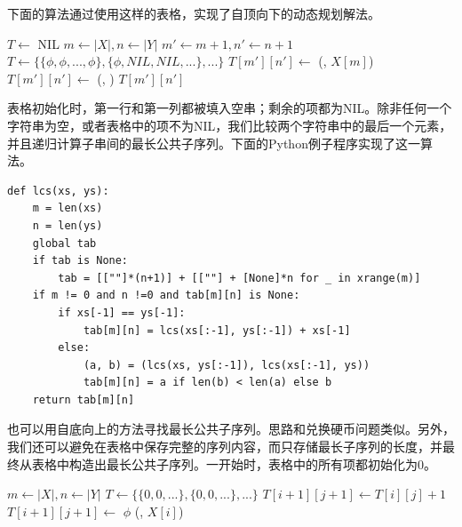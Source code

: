 \documentclass[b5paper]{ctexart}
\begin{document}
下面的算法通过使用这样的表格，实现了自顶向下的动态规划解法。

\begin{algorithmic}[1]
\State $T \gets$ NIL
  \State $m \gets |X|, n \gets |Y|$
  \State $m' \gets m+1, n' \gets n+1$
    \State $T \gets \{\{\phi, \phi, ..., \phi\}, \{\phi, NIL, NIL, ...\}, ...\}$ 
  \EndIf
      \State $T[m'][n'] \gets$ (, $X[m]$)
    \Else
      \State $T[m'][n'] \gets$ (, )
    \EndIf
  \EndIf
  \State \Return $T[m'][n']$
\EndFunction
\end{algorithmic}

表格初始化时，第一行和第一列都被填入空串；剩余的项都为NIL。除非任何一个字符串为空，或者表格中的项不为NIL，我们比较两个字符串中的最后一个元素，并且递归计算子串间的最长公共子序列。下面的Python例子程序实现了这一算法。

\lstset{language=Python}
\begin{lstlisting}
def lcs(xs, ys):
    m = len(xs)
    n = len(ys)
    global tab
    if tab is None:
        tab = [[""]*(n+1)] + [[""] + [None]*n for _ in xrange(m)]
    if m != 0 and n !=0 and tab[m][n] is None:
        if xs[-1] == ys[-1]:
            tab[m][n] = lcs(xs[:-1], ys[:-1]) + xs[-1]
        else:
            (a, b) = (lcs(xs, ys[:-1]), lcs(xs[:-1], ys))
            tab[m][n] = a if len(b) < len(a) else b
    return tab[m][n]
\end{lstlisting}

也可以用自底向上的方法寻找最长公共子序列。思路和兑换硬币问题类似。另外，我们还可以避免在表格中保存完整的序列内容，而只存储最长子序列的长度，并最终从表格中构造出最长公共子序列。一开始时，表格中的所有项都初始化为0。

\begin{algorithmic}[1]
  \State $m \gets |X|, n \gets |Y|$
  \State $T \gets \{\{0, 0, ...\}, \{0, 0, ...\}, ...\}$ 
        \State $T[i+1][j+1] \gets T[i][j] + 1$
      \Else
        \State $T[i+1][j+1] \gets$ 
      \EndIf
    \EndFor
  \EndFor
  \State \Return {}
\EndFunction
\Statex
{}
    \State \Return $\phi$
    \State \Return {}(, $X[i]$)
    \State \Return {}
  \Else
    \State \Return {}
  \EndIf
\EndFunction
\end{algorithmic}
\end{document}
